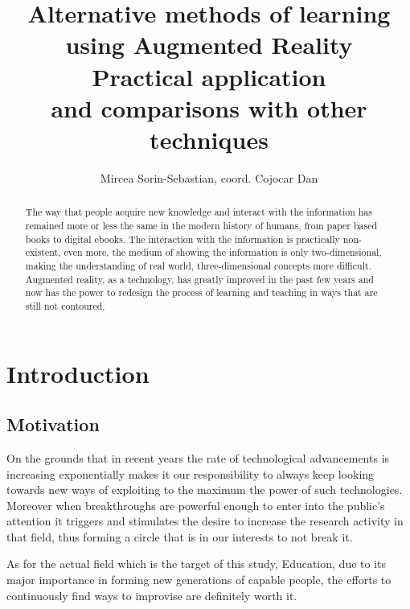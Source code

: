 \documentclass[12 pct]{report}
\begin{document}
\title{%
  Alternative methods of learning using Augmented Reality\\
  \large Practical application \\
    and comparisons with other techniques}

\author{Mircea Sorin-Sebastian, coord. Cojocar Dan}

\maketitle

\begin{abstract}
The way that people acquire new knowledge and interact with the information has remained more or less the same in the modern history of humans, from paper based books to digital ebooks. The interaction with the information is practically non-existent, even more, the medium of showing the information is only two-dimensional, making the understanding of real world, three-dimensional concepts more difficult. Augmented reality, as a technology, has greatly improved in the past few years and now has the power to redesign the process of learning and teaching in ways that are still not contoured.
\end{abstract}

\tableofcontents

\listoffigures

\listoftables

\chapter{Introduction}

\section{Motivation}
On the grounds that in recent years the rate of technological advancements is increasing exponentially makes it our responsibility to always keep looking towards new ways of exploiting to the maximum the power of such technologies. Moreover when breakthroughs are powerful enough to enter into the public's attention it triggers and stimulates the desire to increase the research activity in that field, thus forming a circle that is in our interests to not break it.

As for the actual field which is the target of this study, Education, due to its major importance in forming new generations of capable people, the efforts to continuously find ways to improvise are definitely worth  it. 
\end{document}
